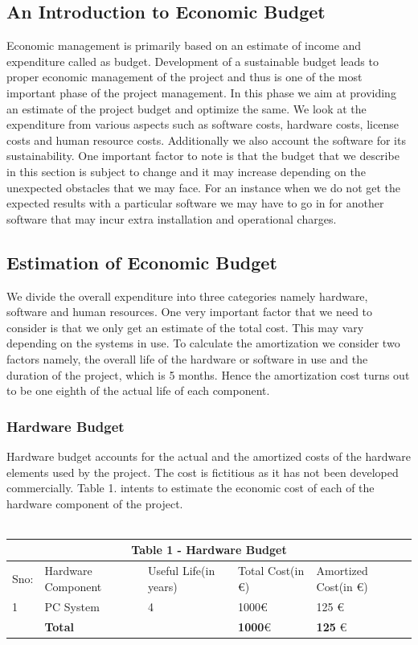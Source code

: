 \subsection{An Introduction to Economic Budget}
Economic management is primarily based on an estimate of income and expenditure called as
budget. Development of a sustainable budget leads to proper economic management of the
project and thus is one of the most important phase of the project
management. In this phase we aim at providing an
estimate of the project budget and optimize the same. We look at the expenditure from various
aspects such as software costs, hardware costs, license costs and human resource costs.
Additionally we also account the software for its sustainability. One important factor to note is
that the budget that we describe in this section is subject to change and it may increase
depending on the unexpected obstacles that we may face. For an instance when we do not get
the expected results with a particular software we may have to go in for another software that
may incur extra installation and operational charges.
\subsection{Estimation of Economic Budget}
We divide the overall expenditure into three categories namely hardware, software and human
resources. One very important factor that we need to consider is that we only get an estimate
of the total cost. This may vary depending on the systems in use. To calculate the amortization
we consider two factors namely,  the overall life of the hardware or software in use and the duration of the project, which is 5 months. Hence the amortization cost turns out to be one eighth
of the actual life of each component.\\

\subsubsection{Hardware Budget} Hardware budget accounts for the actual and the amortized costs of the hardware elements
used by the project. The cost is fictitious as it has not been developed commercially. Table 1.
intents to estimate the economic cost of each of the hardware component of the project.
\\\\
\begin{table}[H]
\centering
\begin{tabular}{|p{1cm}||p{3cm}|p{2cm}|p{3cm}|p{3cm}|}
 \hline
 \multicolumn{5}{|c|}{Table 1 - Hardware Budget} \\
 \hline
 Sno: & Hardware Component&Useful Life(in years) &Total Cost(in \euro) &Amortized Cost(in \euro)\\
 \hline
1   & PC System  &4 &  1000\euro  & 125 \euro \\
\hline
\hline
   & \textbf{Total}  &  &  \textbf{1000}\euro  & \textbf{125} \euro \\
 \hline

\end{tabular}
\end{table}

